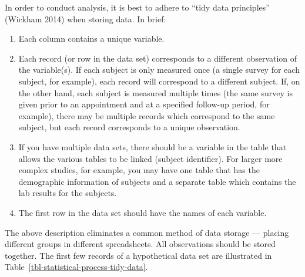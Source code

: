 \documentclass[
  letterpaper,
  DIV=11,
  numbers=noendperiod]{scrreprt}
\providecommand{\tightlist}{%
  \setlength{\itemsep}{0pt}\setlength{\parskip}{0pt}}\usepackage{longtable,booktabs,array}
\theoremstyle{definition}
\theoremstyle{definition}
\theoremstyle{remark}
\begin{document}
In order to conduct analysis, it is best to adhere to ``tidy data
principles'' (Wickham 2014) when storing data. In brief:

\begin{enumerate}
\def\labelenumi{\arabic{enumi}.}
\tightlist
\item
  Each column contains a unique variable.
\item
  Each record (or row in the data set) corresponds to a different
  observation of the variable(s). If each subject is only measured once
  (a single survey for each subject, for example), each record will
  correspond to a different subject. If, on the other hand, each subject
  is measured multiple times (the same survey is given prior to an
  appointment and at a specified follow-up period, for example), there
  may be multiple records which correspond to the same subject, but each
  record corresponds to a unique observation.
\item
  If you have multiple data sets, there should be a variable in the
  table that allows the various tables to be linked (subject
  identifier). For larger more complex studies, for example, you may
  have one table that has the demographic information of subjects and a
  separate table which contains the lab results for the subjects.
\item
  The first row in the data set should have the names of each variable.
\end{enumerate}

The above description eliminates a common method of data storage ---
placing different groups in different spreadsheets. All observations
should be stored together. The first few records of a hypothetical data
set are illustrated in Table~\ref{tbl-statistical-process-tidy-data}.
\end{document}
